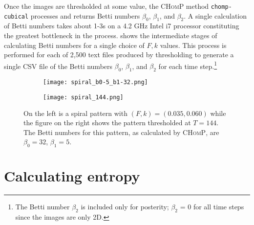 Once the images are thresholded at some value, the \textsc{CHomP} method \texttt{chomp-cubical} processes and returns Betti numbers $\beta_0$, $\beta_1$, and $\beta_2$.  A single calculation of Betti numbers takes about 1-3s on a 4.2 GHz Intel i7 processor constituting the greatest bottleneck in the process.  shows the intermediate stages of calculating Betti numbers for a single choice of $F,k$ values. This process is performed for each of 2,500 text files produced by thresholding to generate a single CSV file of the Betti numbers $\beta_0$, $\beta_1$, and $\beta_2$ for each time step.\footnote{The Betti number $\beta_2$ is included only for posterity; $\beta_2$ = 0 for all time steps since the images are only 2D.}

\begin{figure}[h]
	\centering
	\begin{subfigure}[b]{0.33\textwidth}
                \texttt{[image: spiral\_b0-5\_b1-32.png]}
                \caption{}
                \label{fig:spiral_grey}
        \end{subfigure} \quad
	\begin{subfigure}[b]{0.33\textwidth}
                \texttt{[image: spiral\_144.png]}
                \caption{}
                \label{fig:spiral_144}
        \end{subfigure}
        \caption{On the left is a spiral pattern with $(F, k) = (0.035, 0.060)$ while the figure on the right shows the pattern thresholded at $T = 144$. The Betti numbers for this pattern, as calculated by \textsc{CHomP}, are $\beta_0 = 32$, $\beta_1 = 5$.}
        \label{fig:spiral_thresh}
\end{figure}

\section{Calculating entropy} \label{sect:entropy}

